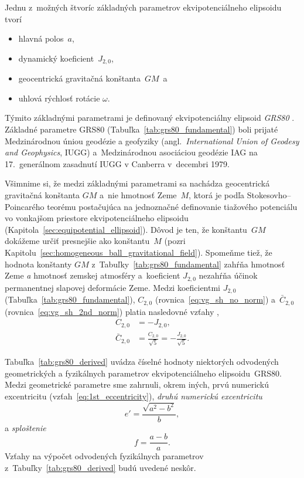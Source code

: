 \documentclass[a4paper, 12pt]{book}
\begin{document}
Jednu z~možných štvoríc základných parametrov ekvipotenciálneho elipsoidu tvorí
%
\begin{itemize}
\item hlavná polos~$a$,
%
\item dynamický koeficient~$J_{2,0}$,
%
\item geocentrická gravitačná konštanta~$GM$~a
%
\item uhlová rýchlosť rotácie $\omega$.
\end{itemize}
%
Týmito základnými parametrami je definovaný ekvipotenciálny elipsoid 
\emph{GRS80} \parencite[angl. \textit{Geodetic Reference 
System~1980};][]{GRS80}.  Základné parametre GRS80 
(Tabuľka~\ref{tab:grs80_fundamental}) boli prijaté Medzinárodnou úniou geodézie 
a geofyziky (angl.~\textit{International Union of Geodesy and Geophysics}, 
IUGG) a~Medzinárodnou asociáciou geodézie IAG na 17.~generálnom zasadnutí IUGG 
v Canberra v~decembri 1979.

Všimnime si, že medzi základnými parametrami sa nachádza geocentrická 
gravitačná konštanta $GM$ a~nie hmotnosť Zeme~$M$, ktorá je podľa 
Stokesovho--Poincarého teorému postačujúca na jednoznačné definovanie tiažového 
potenciálu vo vonkajšom priestore ekvipotenciálneho elipsoidu 
(Kapitola~\ref{sec:equipotential_ellipsoid}).  Dôvod je ten, že konštantu~$GM$ 
dokážeme určiť presnejšie ako konštantu~$M$ (pozri 
Kapitolu~\ref{sec:homogeneous_ball_gravitational_field}).  Spomeňme tiež, že 
hodnota konštanty $GM$ z~Tabuľky~\ref{tab:grs80_fundamental} zahŕňa hmotnosť 
Zeme \emph{a} hmotnosť zemskej atmosféry a~koeficient $J_{2,0}$ nezahŕňa účinok 
permanentnej slapovej deformácie Zeme.  Medzi koeficientmi $J_{2,0}$ 
(Tabuľka~\ref{tab:grs80_fundamental}), $C_{2,0}$ 
(rovnica~\ref{eq:vg_sh_no_norm}) a~$\bar{C}_{2,0}$ 
(rovnica~\ref{eq:vg_sh_2nd_norm}) platia nasledovné vzťahy 
\parencite{Moritz1967,MoritzPhysicalGeodesy},
%
\begin{align}
\label{eq:c20_j20}
C_{2,0} &= -J_{2,0}{,}\\
%
\label{eq:c20_j20_2}
\bar{C}_{2,0} &= \frac{C_{2,0}}{\sqrt{5}} = -\frac{J_{2,0}}{\sqrt{5}}{.}
\end{align}

Tabuľka~\ref{tab:grs80_derived} uvádza číselné hodnoty niektorých odvodených 
geometrických a fyzikálnych parametrov ekvipotenciálneho elipsoidu~GRS80.  
Medzi geometrické parametre sme zahrnuli, okrem iných, prvú numerickú 
excentricitu (vzťah~\ref{eq:1st_eccentricity}), \emph{druhú numerickú 
excentricitu}
%
\begin{equation}
\label{eq:2nd_eccentricity}
e' = \frac{\sqrt{a^2 - b^2}}{b}{,}
\end{equation}
%
a \emph{sploštenie}
%
\begin{equation}
\label{eq:flattening}
f = \frac{a - b}{a}{.}
\end{equation}
%
Vzťahy na výpočet odvodených fyzikálnych parametrov 
z~Tabuľky~\ref{tab:grs80_derived} budú uvedené neskôr.
\end{document}
